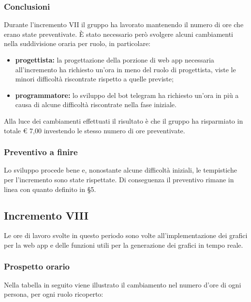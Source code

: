 		\subsubsection*{Conclusioni}
			Durante l'incremento VII il gruppo ha lavorato mantenendo il numero di ore che erano state preventivate. È stato necessario però svolgere alcuni cambiamenti nella suddivisione oraria per ruolo, in particolare:
		\begin{itemize}
			\item \textbf{progettista:} la progettazione della porzione di web app necessaria all'incremento ha richiesto un'ora in meno del ruolo di progettista, viste le minori difficoltà riscontrate rispetto a quelle previste;
			\item \textbf{programmatore:} lo sviluppo del bot telegram ha richiesto un'ora in più a causa di alcune difficoltà riscontrate nella fase iniziale.
		\end{itemize}
			Alla luce dei cambiamenti effettuati il risultato è che il gruppo ha risparmiato in totale € 7,00 investendo le stesso numero di ore preventivate.
		
		\subsubsection{Preventivo a finire}
			Lo sviluppo procede bene e, nonostante alcune difficoltà iniziali, le tempistiche per l'incremento sono state rispettate. 
			\newline
			Di conseguenza il preventivo rimane in linea con quanto definito in \S5.
		
		
		\subsection{Incremento VIII}
			Le ore di lavoro svolte in questo periodo sono volte all'implementazione dei grafici per la web app e delle funzioni utili per la generazione dei grafici in tempo reale.
		\subsubsection{Prospetto orario}
			Nella tabella in seguito viene illustrato il cambiamento nel numero d'ore di ogni persona, per ogni ruolo ricoperto:
		
